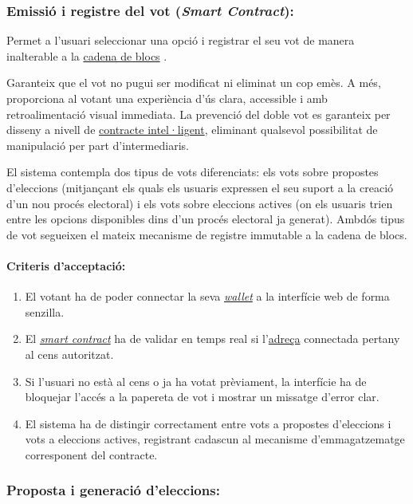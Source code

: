 \subsubsection{Emissió i registre del vot (\textit{Smart Contract}):}
Permet a l'usuari seleccionar una opció i registrar el seu vot de manera inalterable a la \hyperlink{def:blockchain}{cadena de blocs} \cite{nakamoto}.

Garanteix que el vot no pugui ser modificat ni eliminat un cop emès. 
A més, proporciona al votant una experiència d'ús clara, accessible i amb retroalimentació visual immediata. La prevenció del doble vot es garanteix per disseny a nivell de \hyperlink{def:smartcontract}{contracte intel·ligent}, eliminant qualsevol possibilitat de manipulació per part d'intermediaris.

El sistema contempla dos tipus de vots diferenciats: els vots sobre propostes d'eleccions (mitjançant els quals els usuaris expressen el seu suport a la creació d'un nou procés electoral) i els vots sobre eleccions actives (on els usuaris trien entre les opcions disponibles dins d'un procés electoral ja generat). Ambdós tipus de vot segueixen el mateix mecanisme de registre immutable a la cadena de blocs.

\paragraph{Criteris d'acceptació:}
\begin{enumerate}[label=\roman*.]
    \item El votant ha de poder connectar la seva \hyperlink{def:wallet}{\textit{wallet}} a la interfície web de forma senzilla.
    \item El \hyperlink{def:smartcontract}{\textit{smart contract}} ha de validar en temps real si l'\hyperlink{def:adreca}{adreça} connectada pertany al cens autoritzat.
    \item Si l'usuari no està al cens o ja ha votat prèviament, la interfície ha de bloquejar l'accés a la papereta de vot i mostrar un missatge d'error clar.
    \item El sistema ha de distingir correctament entre vots a propostes d'eleccions i vots a eleccions actives, registrant cadascun al mecanisme d'emmagatzematge corresponent del contracte.
\end{enumerate}

\subsubsection{Proposta i generació d'eleccions:}

